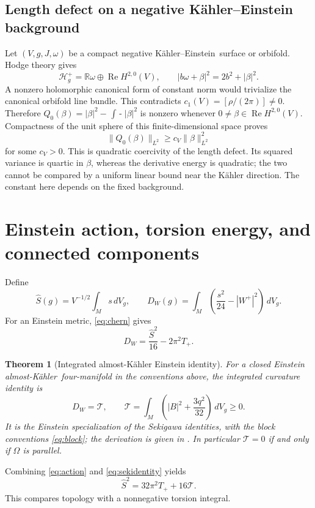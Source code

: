 \documentclass[11pt,a4paper]{article}
\newtheorem{inputtheorem}[theorem]{Theorem}
\theoremstyle{definition}
\theoremstyle{remark}
\newcommand{\Rea}{\operatorname{Re}}
\newcommand{\dd}{\,dV_g}
\newcommand{\avint}{\mathop{\int\!\!\!-}}
\newcommand{\R}{\mathbb R}
\newcommand{\cT}{\mathcal T}
\newcommand{\AK}{almost-K\"ahler}
\newcommand{\KE}{K\"ahler--Einstein}
\begin{document}
\subsection{Length defect on a negative K\"ahler--Einstein background}
Let $(V,g,J,\omega)$ be a compact negative \KE\ surface or orbifold. Hodge theory gives
\[
 \mathcal H_g^+=\R\omega\oplus\Rea H^{2,0}(V),\qquad
 |b\omega+\beta|^2=2b^2+|\beta|^2.
\]
A nonzero holomorphic canonical form of constant norm would trivialize the canonical orbifold line bundle. This contradicts $c_1(V)=[\rho/(2\pi)]\ne0$. Therefore $Q_0(\beta)=|\beta|^2-\avint|\beta|^2$ is nonzero whenever $0\ne\beta\in\Rea H^{2,0}(V)$. Compactness of the unit sphere of this finite-dimensional space proves
\begin{equation}\label{eq:lengthcoercivity}
 \|Q_0(\beta)\|_{L^2}\ge c_V\|\beta\|_{L^2}^2
\end{equation}
for some $c_V>0$. This is quadratic coercivity of the length defect. Its squared variance is quartic in $\beta$, whereas the derivative energy is quadratic; the two cannot be compared by a uniform linear bound near the K\"ahler direction. The constant here depends on the fixed background.

\section{Einstein action, torsion energy, and connected components}
Define
\[
 \widehat S(g)=V^{-1/2}\int_Ms\dd,\qquad
 D_W(g)=\int_M\left(\frac{s^2}{24}-|W^+|^2\right)\dd.
\]
For an Einstein metric, \eqref{eq:chern} gives
\begin{equation}\label{eq:action}
 D_W=\frac{\widehat S^2}{16}-2\pi^2T_+.
\end{equation}
\begin{inputtheorem}[Integrated almost-K\"ahler Einstein identity]\label{input:sek}
For a closed Einstein \AK\ four-manifold in the conventions above, the integrated curvature identity is
\begin{equation}\label{eq:sekidentity}
 D_W=\cT,\qquad
 \cT=\int_M\left(|B|^2+\frac{3q^2}{32}\right)\dd\ge0.
\end{equation}
It is the Einstein specialization of the Sekigawa identities, with the block conventions \eqref{eq:block}; the derivation is given in \cite{GlobalSource,Repository}. In particular $\cT=0$ if and only if $\Omega$ is parallel.
\end{inputtheorem}
Combining \eqref{eq:action} and \eqref{eq:sekidentity} yields
\begin{equation}\label{eq:actiontorsion}
 \widehat S^2=32\pi^2T_++16\cT.
\end{equation}
This compares topology with a nonnegative torsion integral.
\end{document}
